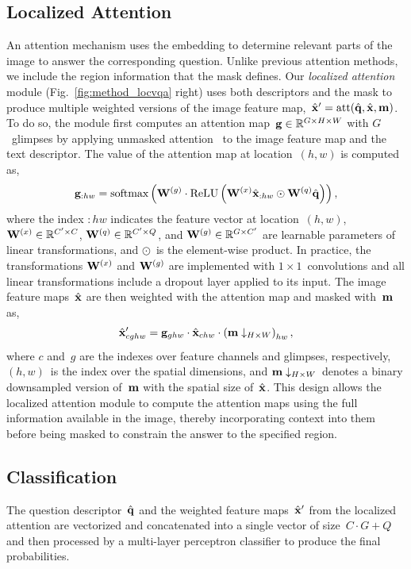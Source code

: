 \subsection{Localized Attention} An attention mechanism uses the embedding to determine relevant parts of the image to answer the corresponding question. Unlike previous attention methods, we include the region information that the mask defines. Our \emph{localized attention} module (Fig.~\ref{fig:method_locvqa} right) uses both descriptors and the mask to produce multiple weighted versions of the image feature map,~$\hat{\mathbf{x}}'=\textrm{att}(\hat{\mathbf{q}}, \hat{\mathbf{x}}, \mathbf{m})$. To do so, the module first computes an attention map~$\mathbf{g}\in\mathbb{R}^{G\times{}H\times{}W}$ with $G$~glimpses by applying unmasked attention~\cite{kim2016hadamard,vu2020question} to the image feature map and the text descriptor. The value of the attention map at location~$(h, w)$ is computed as,
\begin{equation}
    \mathbf{g}_{:hw} = \textrm{softmax}\left(\mathbf{W}^{(g)}\cdot\textrm{ReLU}\left(\mathbf{W}^{(x)}\hat{\mathbf{x}}_{:hw} \odot \mathbf{W}^{(q)}\hat{\mathbf{q}}\right)\right),
\end{equation}
where the index ${:}hw$ indicates the feature vector at location~$(h, w)$, $\mathbf{W}^{(x)}\in\mathbb{R}^{C'\times C}$, $\mathbf{W}^{(q)}\in\mathbb{R}^{C'\times Q}$, and $\mathbf{W}^{(g)}\in\mathbb{R}^{G\times C'}$ are learnable parameters of linear transformations, and $\odot$~is the element-wise product. In practice, the transformations $\mathbf{W}^{(x)}$ and $\mathbf{W}^{(g)}$ are implemented with $1\times{}1$~convolutions and all linear transformations include a dropout layer applied to its input. The image feature maps~$\hat{\mathbf{x}}$ are then weighted with the attention map and masked with~$\mathbf{m}$ as,
\begin{equation}
    \hat{\mathbf{x}}'_{cghw} = \mathbf{g}_{ghw} \cdot \hat{\mathbf{x}}_{chw} \cdot \left(\mathbf{m}\downarrow_{H\times{}W}\right)_{hw},
\end{equation}
where $c$ and~$g$ are the indexes over feature channels and glimpses, respectively, $(h, w)$~is the index over the spatial dimensions, and $\mathbf{m}\downarrow_{H\times{}W}$~denotes a binary downsampled version of~$\mathbf{m}$ with the spatial size of~$\hat{\mathbf{x}}$. This design allows the localized attention module to compute the attention maps using the full information available in the image, thereby incorporating context into them before being masked to constrain the answer to the specified region.

\subsection{Classification} The question descriptor~$\hat{\mathbf{q}}$ and the weighted feature maps~$\hat{\mathbf{x}}'$ from the localized attention are vectorized and concatenated into a single vector of size~$C\cdot{}G + Q$ and then processed by a multi-layer perceptron classifier to produce the final probabilities.

